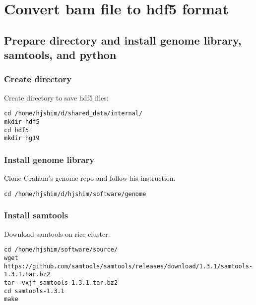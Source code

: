 \documentclass[11pt]{article}
\begin{document}
\section{Convert bam file to hdf5 format}
\label{sec-2}
\subsection{Prepare directory and install genome library, samtools, and python}
\label{sec-2-1}
\subsubsection{Create directory}
\label{sec-2-1-1}
Create directory to save hdf5 files:
\begin{lstlisting}
cd /home/hjshim/d/shared_data/internal/
mkdir hdf5
cd hdf5
mkdir hg19
\end{lstlisting}
\subsubsection{Install genome library}
\label{sec-2-1-2}
Clone Graham's genome repo and follow his instruction.
\begin{lstlisting}
cd /home/hjshim/d/hjshim/software/genome
\end{lstlisting}
\subsubsection{Install samtools}
\label{sec-2-1-3}
Download samtools on rice cluster:
\begin{lstlisting}
cd /home/hjshim/software/source/
wget https://github.com/samtools/samtools/releases/download/1.3.1/samtools-1.3.1.tar.bz2
tar -vxjf samtools-1.3.1.tar.bz2
cd samtools-1.3.1
make
\end{lstlisting}
\end{document}
